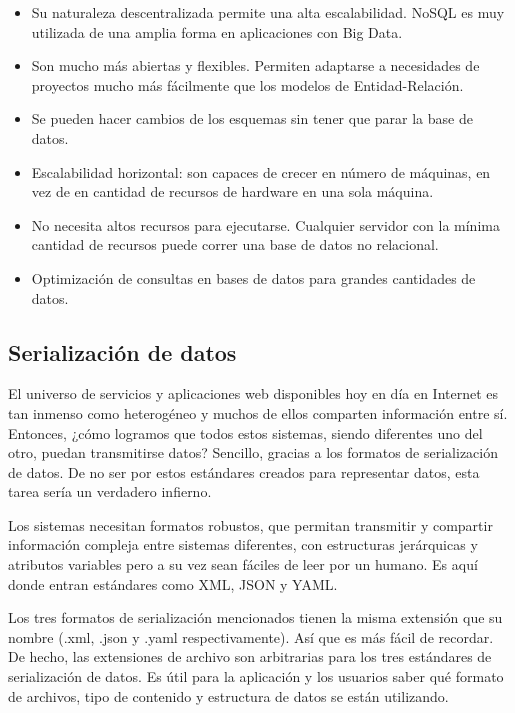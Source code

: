 \begin{itemize}
  \item Su naturaleza descentralizada permite una alta escalabilidad. NoSQL es muy utilizada de una amplia forma en aplicaciones con Big Data.
  \item Son mucho más abiertas y flexibles. Permiten adaptarse a necesidades de proyectos mucho más fácilmente que los modelos de Entidad-Relación.
  \item Se pueden hacer cambios de los esquemas sin tener que parar la base de datos.
  \item Escalabilidad horizontal: son capaces de crecer en número de máquinas, en vez de en cantidad de recursos de hardware en una sola máquina.
  \item No necesita altos recursos para ejecutarse. Cualquier servidor con la mínima cantidad de recursos puede correr una base de datos no relacional.
  \item Optimización de consultas en bases de datos para grandes cantidades de datos.
\end{itemize}

\subsection{Serialización de datos}

El universo de servicios y aplicaciones web disponibles hoy en día en Internet es tan inmenso como heterogéneo y muchos de ellos comparten información entre sí. Entonces, ¿cómo logramos que todos estos sistemas, siendo diferentes uno del otro, puedan transmitirse datos? Sencillo, gracias a los formatos de serialización de datos. De no ser por estos estándares creados para representar datos, esta tarea sería un verdadero infierno.

Los sistemas necesitan formatos robustos, que permitan transmitir y compartir información compleja entre sistemas diferentes, con estructuras jerárquicas y atributos variables pero a su vez sean fáciles de leer por un humano. Es aquí donde entran estándares como XML, JSON y YAML.

Los tres formatos de serialización mencionados tienen la misma extensión que su nombre (.xml, .json y .yaml respectivamente). Así que es más fácil de recordar. De hecho, las extensiones de archivo son arbitrarias para los tres estándares de serialización de datos. Es útil para la aplicación y los usuarios saber qué formato de archivos, tipo de contenido y estructura de datos se están utilizando.

